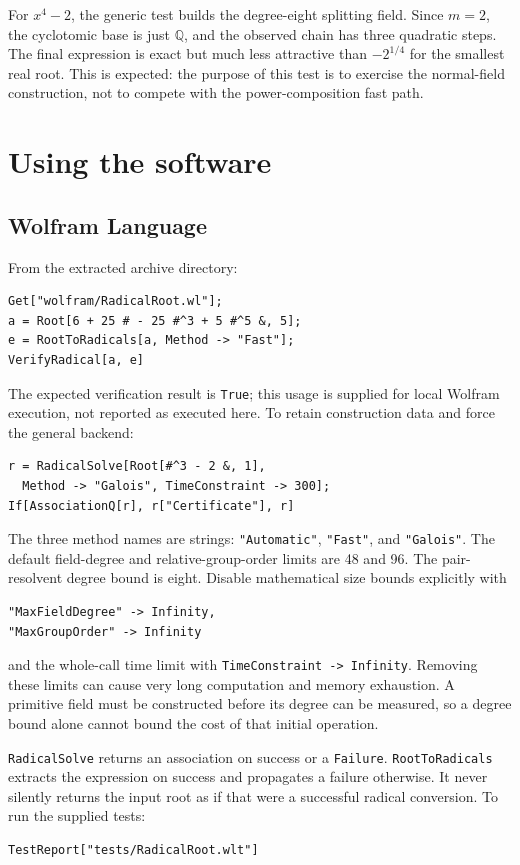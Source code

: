 \documentclass[11pt,a4paper]{article}
\newcommand{\Q}{\mathbb Q}
\newcommand{\code}[1]{\texttt{\small #1}}
\theoremstyle{definition}
\begin{document}
For $x^4-2$, the generic test builds the degree-eight splitting field. Since
$m=2$, the cyclotomic base is just $\Q$, and the observed chain has three
quadratic steps. The final expression is exact but much less attractive than
$-2^{1/4}$ for the smallest real root. This is expected: the purpose of this
test is to exercise the normal-field construction, not to compete with the
power-composition fast path.

\section{Using the software}
\subsection{Wolfram Language}
From the extracted archive directory:
\begin{lstlisting}
Get["wolfram/RadicalRoot.wl"];
a = Root[6 + 25 # - 25 #^3 + 5 #^5 &, 5];
e = RootToRadicals[a, Method -> "Fast"];
VerifyRadical[a, e]
\end{lstlisting}
The expected verification result is \code{True}; this usage is supplied for
local Wolfram execution, not reported as executed here. To retain construction
data and force the general backend:
\begin{lstlisting}
r = RadicalSolve[Root[#^3 - 2 &, 1],
  Method -> "Galois", TimeConstraint -> 300];
If[AssociationQ[r], r["Certificate"], r]
\end{lstlisting}
The three method names are strings: \code{"Automatic"}, \code{"Fast"}, and
\code{"Galois"}. The default field-degree and relative-group-order limits are
48 and 96. The pair-resolvent degree bound is eight. Disable mathematical size
bounds explicitly with
\begin{lstlisting}
"MaxFieldDegree" -> Infinity,
"MaxGroupOrder" -> Infinity
\end{lstlisting}
and the whole-call time limit with \code{TimeConstraint -> Infinity}. Removing
these limits can cause very long computation and memory exhaustion. A primitive
field must be constructed before its degree can be measured, so a degree bound
alone cannot bound the cost of that initial operation.

\code{RadicalSolve} returns an association on success or a \code{Failure}.
\code{RootToRadicals} extracts the expression on success and propagates a
failure otherwise. It never silently returns the input root as if that were a
successful radical conversion. To run the supplied tests:
\begin{lstlisting}
TestReport["tests/RadicalRoot.wlt"]
\end{lstlisting}
\end{document}
